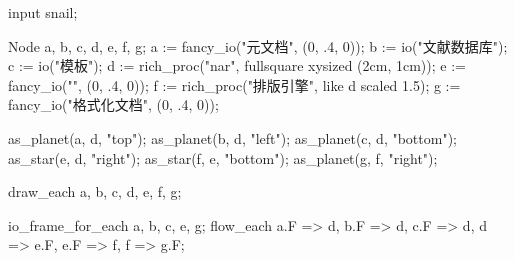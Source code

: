 \usemodule[zhfonts]
  
\startMPpage
input snail;

Node a, b, c, d, e, f, g;
a := fancy_io("元文档", (0, .4, 0));
b := io("文献数据库");
c := io("模板");
d := rich_proc("nar", fullsquare xysized (2cm, 1cm));
e := fancy_io("", (0, .4, 0));
f := rich_proc("排版引擎", like d scaled 1.5);
g := fancy_io("格式化文档", (0, .4, 0));

as_planet(a, d, "top"); as_planet(b, d, "left"); as_planet(c, d, "bottom");
as_star(e, d, "right"); as_star(f, e, "bottom"); as_planet(g, f, "right");

draw_each a, b, c, d, e, f, g;

io_frame_for_each a, b, c, e, g;
flow_each a.F => d, b.F => d, c.F => d, d => e.F, e.F => f, f => g.F;
\stopMPpage
